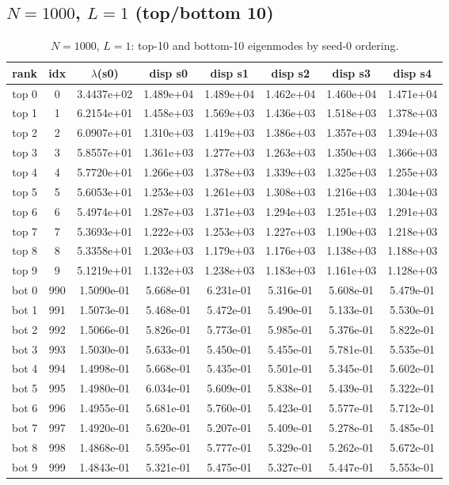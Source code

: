 \subsection{$N=1000$, $L=1$ (top/bottom 10)}
\begin{table}[H]
\centering
\caption{$N=1000$, $L=1$: top-10 and bottom-10 eigenmodes by seed-0 ordering.}
\label{tab:permode-N1000-L1}
\begin{tabular}{c c c c c c c c}
\toprule
rank & idx & $\lambda$(s0) & disp s0 & disp s1 & disp s2 & disp s3 & disp s4 \\
\midrule
top 0 & 0 & 3.4437e+02 & 1.489e+04 & 1.489e+04 & 1.462e+04 & 1.460e+04 & 1.471e+04 \\
top 1 & 1 & 6.2154e+01 & 1.458e+03 & 1.569e+03 & 1.436e+03 & 1.518e+03 & 1.378e+03 \\
top 2 & 2 & 6.0907e+01 & 1.310e+03 & 1.419e+03 & 1.386e+03 & 1.357e+03 & 1.394e+03 \\
top 3 & 3 & 5.8557e+01 & 1.361e+03 & 1.277e+03 & 1.263e+03 & 1.350e+03 & 1.366e+03 \\
top 4 & 4 & 5.7720e+01 & 1.266e+03 & 1.378e+03 & 1.339e+03 & 1.325e+03 & 1.255e+03 \\
top 5 & 5 & 5.6053e+01 & 1.253e+03 & 1.261e+03 & 1.308e+03 & 1.216e+03 & 1.304e+03 \\
top 6 & 6 & 5.4974e+01 & 1.287e+03 & 1.371e+03 & 1.294e+03 & 1.251e+03 & 1.291e+03 \\
top 7 & 7 & 5.3693e+01 & 1.222e+03 & 1.253e+03 & 1.227e+03 & 1.190e+03 & 1.218e+03 \\
top 8 & 8 & 5.3358e+01 & 1.203e+03 & 1.179e+03 & 1.176e+03 & 1.138e+03 & 1.188e+03 \\
top 9 & 9 & 5.1219e+01 & 1.132e+03 & 1.238e+03 & 1.183e+03 & 1.161e+03 & 1.128e+03 \\
\midrule
bot 0 & 990 & 1.5090e-01 & 5.668e-01 & 6.231e-01 & 5.316e-01 & 5.608e-01 & 5.479e-01 \\
bot 1 & 991 & 1.5073e-01 & 5.468e-01 & 5.472e-01 & 5.490e-01 & 5.133e-01 & 5.530e-01 \\
bot 2 & 992 & 1.5066e-01 & 5.826e-01 & 5.773e-01 & 5.985e-01 & 5.376e-01 & 5.822e-01 \\
bot 3 & 993 & 1.5030e-01 & 5.633e-01 & 5.450e-01 & 5.455e-01 & 5.781e-01 & 5.535e-01 \\
bot 4 & 994 & 1.4998e-01 & 5.668e-01 & 5.435e-01 & 5.501e-01 & 5.345e-01 & 5.602e-01 \\
bot 5 & 995 & 1.4980e-01 & 6.034e-01 & 5.609e-01 & 5.838e-01 & 5.439e-01 & 5.322e-01 \\
bot 6 & 996 & 1.4955e-01 & 5.681e-01 & 5.760e-01 & 5.423e-01 & 5.577e-01 & 5.712e-01 \\
bot 7 & 997 & 1.4920e-01 & 5.620e-01 & 5.207e-01 & 5.409e-01 & 5.278e-01 & 5.485e-01 \\
bot 8 & 998 & 1.4868e-01 & 5.595e-01 & 5.777e-01 & 5.329e-01 & 5.262e-01 & 5.672e-01 \\
bot 9 & 999 & 1.4843e-01 & 5.321e-01 & 5.475e-01 & 5.327e-01 & 5.447e-01 & 5.553e-01 \\
\bottomrule
\end{tabular}
\end{table}

